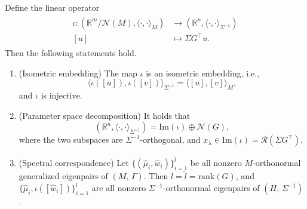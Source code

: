\documentclass[]{myarticle}
\begin{document}
\begin{theorem}\label{thm:isom}
  Define the linear operator 
  \begin{align}\label{isom}
    \begin{split}
      \iota: (\mathbb R^m/\mathcal N(M),\langle\cdot,\cdot\rangle_M)
          &\longrightarrow (\mathbb R^n,\langle\cdot,\cdot\rangle_{\Sigma^{-1}}) \\
      [u] &\longmapsto \Sigma G^{\top}u.
    \end{split}
  \end{align} 
  Then the following statements hold.
\begin{enumerate}
\item[(a)] (Isometric embedding)
The map $\iota$ is an isometric embedding, i.e.,
\[ \langle \iota([u]),\iota([v])\rangle_{\Sigma^{-1}}
=\langle [u],[v]\rangle_M,
\]
and $\iota$ is injective.
\item[(b)] (Parameter space decomposition)
It holds that 
\begin{equation*}
  (\mathbb R^n,\langle\cdot,\cdot\rangle_{\Sigma^{-1}})
  = \mathrm{Im}(\iota) \oplus \mathcal{N}(G) ,
\end{equation*}
where the two subspaces are $\Sigma^{-1}$-orthogonal, and $x_{\lambda}\in \mathrm{Im}(\iota)=\mathcal{R}(\Sigma G^\top)$.
\item[(c)] (Spectral correspondence)
Let $\{(\hat\mu_i,\hat w_i)\}_{i=1}^{\hat{l}}$ be all nonzero $M$-orthonormal generalized eigenpairs of $(M,\,\Gamma)$. Then $l=\hat{l}=\mathrm{rank}(G)$, and $\{\hat\mu_i,\iota([\hat w_i])\}_{i=1}^{l}$ are all nonzero $\Sigma^{-1}$-orthonormal eigenpairs of $(H,\,\Sigma^{-1})$.
\end{enumerate}
\end{theorem}
\end{document}
